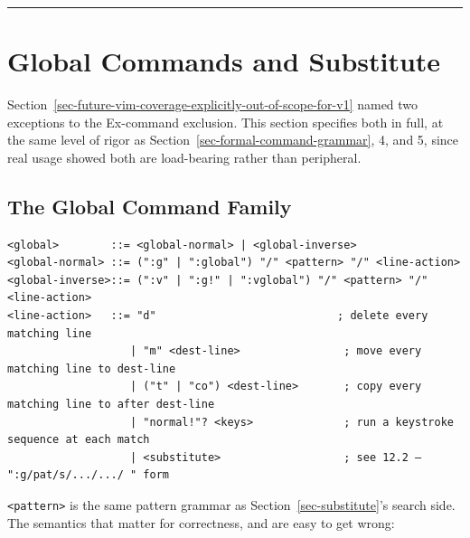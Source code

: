 \documentclass[11pt]{article}
\begin{document}
\begin{center}\rule{0.5\linewidth}{0.5pt}\end{center}

\hypertarget{sec-global-commands-and-substitute}{%
\section{Global Commands and Substitute}\label{sec-global-commands-and-substitute}}

Section~\ref{sec-future-vim-coverage-explicitly-out-of-scope-for-v1} named two exceptions to the Ex-command exclusion. This section
specifies both in full, at the same level of rigor as Section~\ref{sec-formal-command-grammar}, 4, and 5,
since real usage showed both are load-bearing rather than peripheral.

\hypertarget{sec-the-global-command-family}{%
\subsection{The Global Command Family}\label{sec-the-global-command-family}}

\begin{Verbatim}[breaklines=true, breakanywhere=true, fontsize=\small]
<global>        ::= <global-normal> | <global-inverse>
<global-normal> ::= (":g" | ":global") "/" <pattern> "/" <line-action>
<global-inverse>::= (":v" | ":g!" | ":vglobal") "/" <pattern> "/" <line-action>
<line-action>   ::= "d"                            ; delete every matching line
                   | "m" <dest-line>                ; move every matching line to dest-line
                   | ("t" | "co") <dest-line>       ; copy every matching line to after dest-line
                   | "normal!"? <keys>              ; run a keystroke sequence at each match
                   | <substitute>                   ; see 12.2 — ":g/pat/s/.../.../ " form
\end{Verbatim}

\texttt{\textless{}pattern\textgreater{}} is the same pattern grammar as Section~\ref{sec-substitute}'s search side. The
semantics that matter for correctness, and are easy to get wrong:
\end{document}
